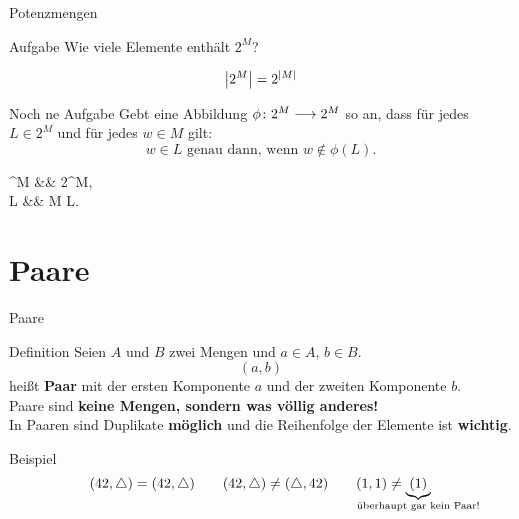 \begin{frame}{Potenzmengen}
	\begin{block}{Aufgabe}
		Wie viele Elemente enthält $2^M$?
		
		\pause
		
		\begin{equation*}
		    \left\lvert 2^M \right\rvert = 2^{\left\lvert M \right\rvert}
		\end{equation*}
	\end{block}
	
	\pause
	\begin{block}{Noch ne Aufgabe}
		Gebt eine Abbildung $\phi \colon 2^{M} \longrightarrow 2^{M}$ so an,
		dass für jedes $L \in 2^{M}$ und für jedes $w \in M$ gilt:
		\begin{equation*}
			w \in L \text{ genau dann, wenn } w \notin \phi(L).
		\end{equation*}
		
		\pause
		\begin{threealign}
			\phi {}^{M} &\functionto& 2^{M},\\
			L &\mapsto& M \setminus L.
		\end{threealign}
	\end{block}
\end{frame}

\section{Paare}

\begin{frame}{Paare}
	\begin{block}{Definition}
		Seien $A$ und $B$ zwei Mengen und $a \in A$, $b \in B$.\\
		$$(a, b)$$ heißt \textbf{Paar} mit der ersten Komponente $a$ und der zweiten Komponente $b$.\\[1em]
		\pause
		Paare sind \textbf{keine Mengen, sondern was \alert{völlig anderes}!} \\
		In Paaren sind Duplikate \textbf{möglich} und die Reihenfolge der Elemente ist \textbf{wichtig}.\\
	\end{block}

	\pause
	\begin{exampleblock}{Beispiel}
		$$ (42, \triangle) = (42, \triangle) \qquad (42, \triangle) \neq (\triangle, 42) \qquad (1, 1) \neq \underbrace{(1)}_{\mathclap{\text{überhaupt gar kein Paar!}}} $$
	\end{exampleblock}
\end{frame}

